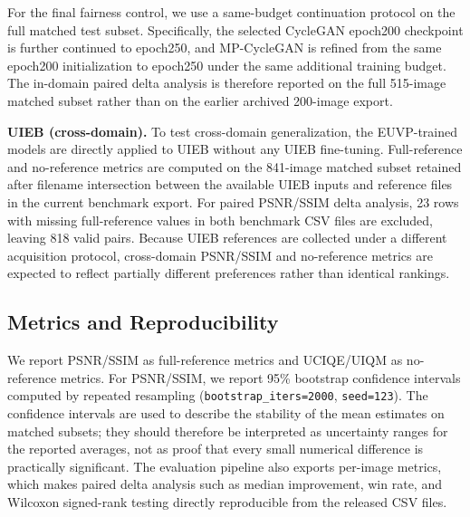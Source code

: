 \documentclass[final,1p,times]{elsarticle}
\begin{document}
For the final fairness control, we use a same-budget continuation protocol on the full matched test subset. Specifically, the selected CycleGAN epoch200 checkpoint is further continued to epoch250, and MP-CycleGAN is refined from the same epoch200 initialization to epoch250 under the same additional training budget. The in-domain paired delta analysis is therefore reported on the full 515-image matched subset rather than on the earlier archived 200-image export.

\textbf{UIEB (cross-domain).} To test cross-domain generalization, the EUVP-trained models are directly applied to UIEB without any UIEB fine-tuning. Full-reference and no-reference metrics are computed on the 841-image matched subset retained after filename intersection between the available UIEB inputs and reference files in the current benchmark export. For paired PSNR/SSIM delta analysis, 23 rows with missing full-reference values in both benchmark CSV files are excluded, leaving 818 valid pairs. Because UIEB references are collected under a different acquisition protocol, cross-domain PSNR/SSIM and no-reference metrics are expected to reflect partially different preferences rather than identical rankings.

\subsection{Metrics and Reproducibility}
We report PSNR/SSIM as full-reference metrics and UCIQE/UIQM as no-reference metrics. For PSNR/SSIM, we report 95\% bootstrap confidence intervals computed by repeated resampling (\texttt{bootstrap\_iters=2000}, \texttt{seed=123}). The confidence intervals are used to describe the stability of the mean estimates on matched subsets; they should therefore be interpreted as uncertainty ranges for the reported averages, not as proof that every small numerical difference is practically significant. The evaluation pipeline also exports per-image metrics, which makes paired delta analysis such as median improvement, win rate, and Wilcoxon signed-rank testing directly reproducible from the released CSV files.
\end{document}
